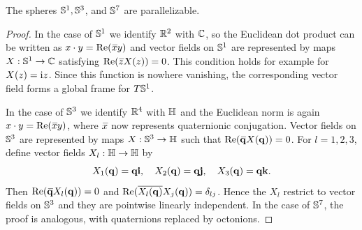 \begin{prop}[{{\cite[Prop.~2.3.17]{RS1}}}]
    The spheres $\bbS^1,\bbS^3$, and $\bbS^7$ are parallelizable.
\end{prop}
\begin{proof}
    In the case of $\bbS^1$ we identify $\bbR^2$ with $\bbC$, so the Euclidean dot product can be written as $x\cdot y=\Re(\wb{x}y)$ and vector fields on $\bbS^1$ are represented by maps $X:\bbS^1\to \bbC$ satisfying $\Re(\wb{z}X(z))=0$. This condition holds for example for $X(z)=\rmi z$. Since this function is nowhere vanishing, the corresponding vector field forms a global frame for $T\bbS^1$.

    In the case of $\bbS^3$ we identify $\bbR^4$ with $\bbH$ and the Euclidean norm is again $x\cdot y=\Re(\wb{x}y)$, where $\wb{x}$ now represents quaternionic conjugation. Vector fields on $\bbS^3$ are represented by maps $X:\bbS^3\to\bbH$ such that $\Re(\wb{\bf{q}}X(\bf{q}))=0$. For $l=1,2,3$, define vector fields $X_l:\bbH\to \bbH$ by
    \[X_1(\bf{q})=\bf{q}\bf{i},\quad X_2(\bf{q})=\bf{q}\bf{j},\quad X_3(\bf{q})=\bf{q}\bf{k}.\]
    Then $\Re(\wb{\bf{q}}X_l(\bf{q}))=0$ and $\Re(\overline{X_l(\bf{q})}X_j(\bf{q}))=\delta_{lj}$. Hence the $X_l$ restrict to vector fields on $\bbS^3$ and they are pointwise linearly independent. In the case of $\bbS^7$, the proof is analogous, with quaternions replaced by octonions.
\end{proof}

